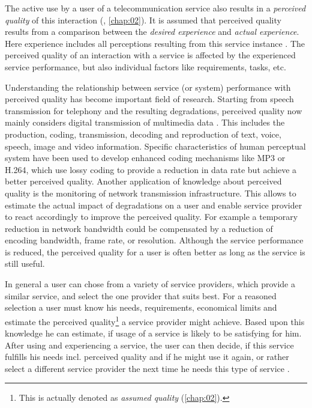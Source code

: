 The active use by a user of a telecommunication service also results in a \emph{perceived quality} of this interaction (\cf, \autoref{chap:02}).
It is assumed that perceived quality results from a comparison between the \emph{desired experience} and \emph{actual experience}. %
Here experience includes all perceptions resulting from this service instance \citep[\cf][p.13]{Book chapter 2}.
The perceived quality of an interaction with a service is affected by the experienced service performance, but also individual factors like requirements, tasks, etc.

Understanding the relationship between service (or system) performance with perceived quality has become important field of research.
Starting from speech transmission for telephony \citep[\cf][]{IEEE Recommended Practice for Speech Quality Measurements} and the resulting degradations, perceived quality now mainly considers digital transmission of multimedia data \citep{moller_quality_2014}.
This includes the production, coding, transmission, decoding and reproduction of text, voice, speech, image and video information.
Specific characteristics of human perceptual system have been used to develop enhanced coding mechanisms like \ac{MP3} or \ac{H.264}, which use lossy coding to provide a reduction in data rate but achieve a better perceived quality.
Another application of knowledge about perceived quality is the monitoring of network transmission infrastructure.
This allows to estimate the actual impact of degradations on a user and enable service provider to react accordingly to improve the perceived quality.
For example a temporary reduction in network bandwidth could be compensated by a reduction of encoding bandwidth, frame rate, or resolution.
Although the service performance is reduced, the perceived quality for a user is often better as long as the service is still useful.

In general a user can chose from a variety of service providers, which provide a similar service, and select the one provider that suits best.
For a reasoned selection a user must know his needs, requirements, economical limits and estimate the perceived quality\footnote{This is actually denoted as \emph{assumed quality} (\cf \autoref{chap:02}).} a service provider might achieve.
Based upon this knowledge he can estimate, if usage of a service is likely to be satisfying for him.
After using and experiencing a service, the user can then decide, if this service fulfills his needs incl. perceived quality and if he might use it again, or rather select a different service provider the next time he needs this type of service \citep[\cf][]{geerts_linking_2010}.

